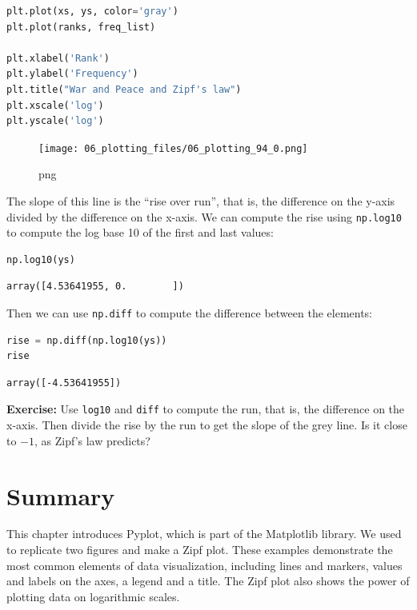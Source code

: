 \documentclass[
]{book}
\newcommand{\passthrough}[1]{#1}
\begin{document}
\begin{lstlisting}[language=Python]
plt.plot(xs, ys, color='gray')
plt.plot(ranks, freq_list)

plt.xlabel('Rank')
plt.ylabel('Frequency')
plt.title("War and Peace and Zipf's law")
plt.xscale('log')
plt.yscale('log')
\end{lstlisting}

\begin{figure}
\centering
\texttt{[image: 06\_plotting\_files/06\_plotting\_94\_0.png]}
\caption{png}
\end{figure}

The slope of this line is the ``rise over run'', that is, the difference
on the y-axis divided by the difference on the x-axis. We can compute
the rise using \passthrough{\lstinline!np.log10!} to compute the log
base 10 of the first and last values:

\begin{lstlisting}[language=Python]
np.log10(ys)
\end{lstlisting}

\begin{lstlisting}
array([4.53641955, 0.        ])
\end{lstlisting}

Then we can use \passthrough{\lstinline!np.diff!} to compute the
difference between the elements:

\begin{lstlisting}[language=Python]
rise = np.diff(np.log10(ys))
rise
\end{lstlisting}

\begin{lstlisting}
array([-4.53641955])
\end{lstlisting}

\textbf{Exercise:} Use \passthrough{\lstinline!log10!} and
\passthrough{\lstinline!diff!} to compute the run, that is, the
difference on the x-axis. Then divide the rise by the run to get the
slope of the grey line. Is it close to \(-1\), as Zipf's law predicts?

\section{Summary}\label{summary}

This chapter introduces Pyplot, which is part of the Matplotlib library.
We used to replicate two figures and make a Zipf plot. These examples
demonstrate the most common elements of data visualization, including
lines and markers, values and labels on the axes, a legend and a title.
The Zipf plot also shows the power of plotting data on logarithmic
scales.

\backmatter
\end{document}
